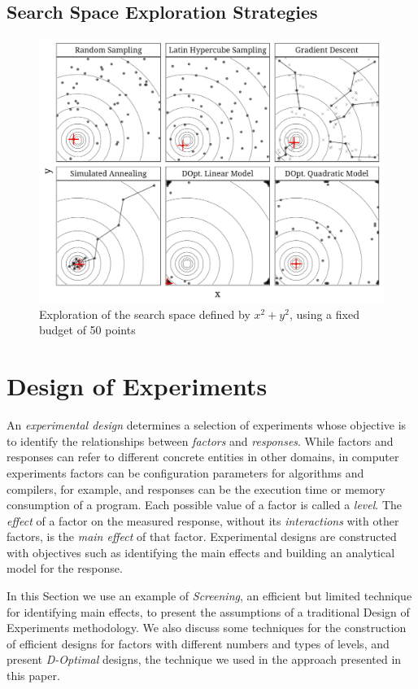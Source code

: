 \documentclass[conference]{IEEEtran}
\begin{document}
\subsection{Search Space Exploration Strategies}
\label{sec:org18896d2}
\begin{center}
\begin{figure}[htbp]
\centering
\includegraphics[width=.95\columnwidth]{./img/sampling_comparison.pdf}
\caption{Exploration of the search space defined by \(x^2 + y^2\), using a fixed budget of 50 points}
\end{figure}
\end{center}
\section{Design of Experiments}
\label{sec:org06d1187}
An \emph{experimental design} determines a selection of experiments whose objective
is to identify the relationships between \emph{factors} and \emph{responses}. While
factors and responses can refer to different concrete entities in other domains,
in computer experiments factors can be configuration parameters for algorithms
and compilers, for example, and responses can be the execution time or memory
consumption of a program. Each possible value of a factor is called a \emph{level}.
The \emph{effect} of a factor on the measured response, without its \emph{interactions}
with other factors, is the \emph{main effect} of that factor. Experimental designs
are constructed with objectives such as identifying the main effects and
building an analytical model for the response.

In this Section we use an example of \emph{Screening}, an efficient but limited
technique for identifying main effects, to present the assumptions of a
traditional Design of Experiments methodology. We also discuss some techniques
for the construction of efficient designs for factors with different numbers and
types of levels, and present \emph{D-Optimal} designs, the technique we used in the
approach presented in this paper.
\end{document}
